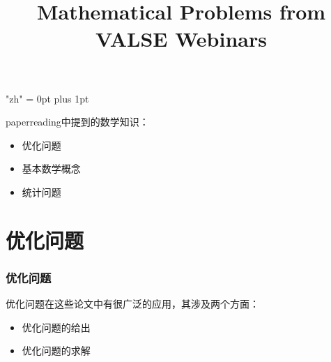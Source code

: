 \documentclass[notheorems,mathserif,table,compress]{beamer}  %
\begin{document}
\XeTeXlinebreaklocale "zh"         %
\XeTeXlinebreakskip = 0pt plus 1pt %
\begin{comment}
\AtBeginSection[]{                              %
  \frame<handout:0>{
    \frametitle{Content}\small
    \tableofcontents[current,currentsubsection]
  }
}
\AtBeginSubsection[]                            %
{
  \frame<handout:0>                             %
  {
    \frametitle{Contents}\small
    \tableofcontents[current,currentsubsection] %
  }
}
\end{comment}
\title[]{Mathematical Problems from VALSE Webinars}
\author[]{}
\institute[ouc]{\small\textcolor{violet}{}}
\date{}
\frame{ \titlepage }


\begin{frame}
paperreading中提到的数学知识：
\begin{itemize}
\item 优化问题
\item 基本数学概念
\item 统计问题
\end{itemize}
\end{frame}

\section{优化问题}
\begin{frame}
\frametitle{优化问题}
优化问题在这些论文中有很广泛的应用，其涉及两个方面：
\begin{itemize}
\item 优化问题的给出
\item 优化问题的求解
\end{itemize}
\end{frame}
\end{document}
